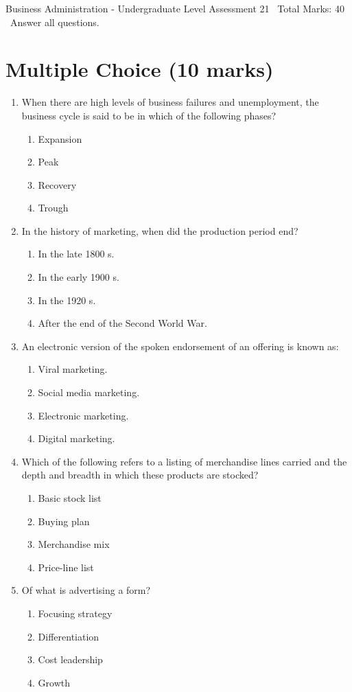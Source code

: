 \documentclass[12pt]{article}
\begin{document}
\begin{center}
Business Administration - Undergraduate Level Assessment 21 \
Total Marks: 40 \
Answer all questions.
\end{center}

\section*{Multiple Choice (10 marks)}
\begin{enumerate}[label=\arabic*.]
\item When there are high levels of business failures and unemployment, the business cycle is said to be in which of the following phases?
\begin{enumerate}[label=(\alph*)]
    \item Expansion
    \item Peak
    \item Recovery
    \item Trough
\end{enumerate}
\item In the history of marketing, when did the production period end?
\begin{enumerate}[label=(\alph*)]
    \item In the late 1800 s.
    \item In the early 1900 s.
    \item In the 1920 s.
    \item After the end of the Second World War.
\end{enumerate}
\item An electronic version of the spoken endorsement of an offering is known as:
\begin{enumerate}[label=(\alph*)]
    \item Viral marketing.
    \item Social media marketing.
    \item Electronic marketing.
    \item Digital marketing.
\end{enumerate}
\item Which of the following refers to a listing of merchandise lines carried and the depth and breadth in which these products are stocked?
\begin{enumerate}[label=(\alph*)]
    \item Basic stock list
    \item Buying plan
    \item Merchandise mix
    \item Price-line list
\end{enumerate}
\item Of what is advertising a form?
\begin{enumerate}[label=(\alph*)]
    \item Focusing strategy
    \item Differentiation
    \item Cost leadership
    \item Growth
\end{enumerate}
\end{enumerate}
\end{document}
